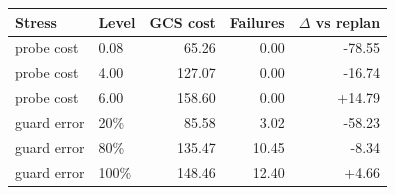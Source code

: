 \begin{tabular}{llrrr}
\toprule
Stress & Level & GCS cost & Failures & $\Delta$ vs replan \\
\midrule
probe cost & 0.08 & 65.26 & 0.00 & -78.55 \\
probe cost & 4.00 & 127.07 & 0.00 & -16.74 \\
probe cost & 6.00 & 158.60 & 0.00 & +14.79 \\
guard error & 20\% & 85.58 & 3.02 & -58.23 \\
guard error & 80\% & 135.47 & 10.45 & -8.34 \\
guard error & 100\% & 148.46 & 12.40 & +4.66 \\
\bottomrule
\end{tabular}
